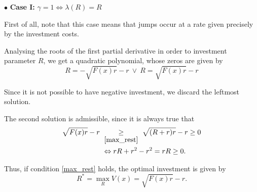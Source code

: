 


$\bullet$ \textbf{Case I:} $\gamma=1 \Leftrightarrow \lambda(R)=R$

First of all, note that this case means that jumps occur at a rate given precisely by the investment costs.

Analysing the roots of the first partial derivative in order to investment parameter $R$, we get a quadratic polynomial, whose zeros are given by
$$  R=-\sqrt{F(x)r}-r \  \vee \ R=\sqrt{F(x)r}-r$$

Since it is not possible to have negative investment, we discard the leftmost solution.

The second solution is admissible, since it is always true that
\begin{align}
 \sqrt{F(x)r}-r  \ &\underset{\eqref{max_rest}}{\geq} \ \sqrt{(R+r)r}-r \geq 0 \nonumber \\
 &\Leftrightarrow rR+r^2-r^2=rR\geq 0.
\end{align}

Thus, if condition \eqref{max_rest} holds, the optimal investment is given by
\begin{equation}
R^*=\max_R V(x)= \sqrt{F(x)r}-r.
\end{equation}


